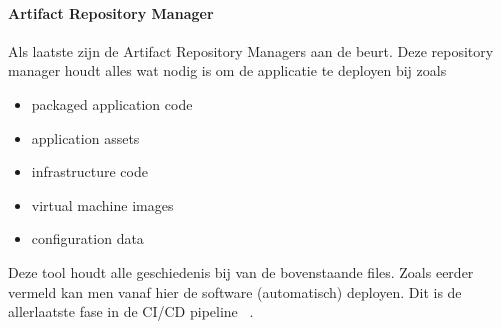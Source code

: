     \paragraph{Artifact Repository Manager}
    Als laatste zijn de Artifact Repository Managers aan de beurt. Deze repository manager houdt alles wat nodig is om de applicatie te deployen bij zoals
    \begin{itemize}
        \item packaged application code
        \item application assets
        \item infrastructure code
        \item virtual machine images
        \item configuration data
    \end{itemize}
    Deze tool houdt alle geschiedenis bij van de bovenstaande files. Zoals eerder vermeld kan men vanaf hier de software (automatisch) deployen. Dit is de allerlaatste fase in de CI/CD pipeline ~\autocite{Skelton2014}.